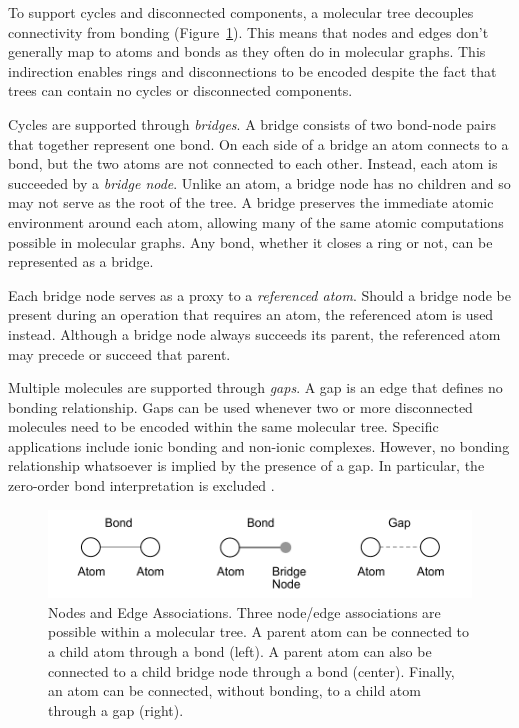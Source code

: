 \documentclass{article}
\begin{document}
To support cycles and disconnected components, a molecular tree decouples connectivity from bonding (Figure~\ref{fig:nodes-and-edge-associations}). This means that nodes and edges don't generally map to atoms and bonds as they often do in molecular graphs. This indirection enables rings and disconnections to be encoded despite the fact that trees can contain no cycles or disconnected components.

Cycles are supported through \textit{bridges}. A bridge consists of two bond-node pairs that together represent one bond. On each side of a bridge an atom connects to a bond, but the two atoms are not connected to each other. Instead, each atom is succeeded by a \textit{bridge node}. Unlike an atom, a bridge node has no children and so may not serve as the root of the tree. A bridge preserves the immediate atomic environment around each atom, allowing many of the same atomic computations possible in molecular graphs. Any bond, whether it closes a ring or not, can be represented as a bridge.

Each bridge node serves as a proxy to a \textit{referenced atom}. Should a bridge node be present during an operation that requires an atom, the referenced atom is used instead. Although a bridge node always succeeds its parent, the referenced atom may precede or succeed that parent.

Multiple molecules are supported through \textit{gaps}. A gap is an edge that defines no bonding relationship. Gaps can be used whenever two or more disconnected molecules need to be encoded within the same molecular tree. Specific applications include ionic bonding and non-ionic complexes. However, no bonding relationship whatsoever is implied by the presence of a gap. In particular, the zero-order bond interpretation is excluded \cite{clark:2011}.

\begin{figure}
    \centering
    \includegraphics[width=\columnwidth]{node-and-edge-associations.pdf}
    \caption{Nodes and Edge Associations. Three node/edge associations are possible within a molecular tree. A parent atom can be connected to a child atom through a bond (left). A parent atom can also be connected to a child bridge node through a bond (center). Finally, an atom can be connected, without bonding, to a child atom through a gap (right).}
    \label{fig:nodes-and-edge-associations}
\end{figure}
\end{document}
